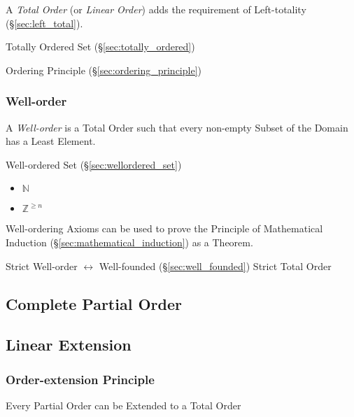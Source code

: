 A \emph{Total Order} (or \emph{Linear Order}) adds the requirement of
Left-totality (\S\ref{sec:left_total}).

Totally Ordered Set (\S\ref{sec:totally_ordered})

Ordering Principle (\S\ref{sec:ordering_principle})



\subsubsection{Well-order}\label{sec:well_order}

A \emph{Well-order} is a Total Order such that every non-empty Subset
of the Domain has a Least Element.

Well-ordered Set (\S\ref{sec:wellordered_set})

\begin{itemize}
  \item $\mathbb{N}$
  \item $\mathbb{Z}^{\geq n}$
\end{itemize}

Well-ordering Axioms can be used to prove the Principle of
Mathematical Induction (\S\ref{sec:mathematical_induction}) as a
Theorem.

Strict Well-order $\leftrightarrow$ Well-founded
(\S\ref{sec:well_founded}) Strict Total Order



\subsection{Complete Partial Order}\label{sec:complete_partialorder}

\subsection{Linear Extension}\label{sec:linear_extension}

\subsubsection{Order-extension Principle}
\label{sec:order_extension_principle}

Every Partial Order can be Extended to a Total Order



